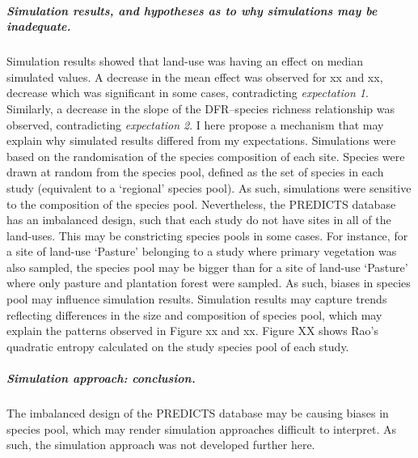 \subparagraph{Simulation results, and hypotheses as to why simulations may be inadequate.}
Simulation results showed that land-use was having an effect on median simulated values. A decrease in the mean effect was observed for xx and xx, decrease which was significant in some cases, contradicting \textit{expectation 1}. Similarly, a decrease in the slope of the DFR--species richness relationship was observed, contradicting \textit{expectation 2}. I here propose a mechanism that may explain why simulated results differed from my expectations. Simulations were based on the randomisation of the species composition of each site. Species were drawn at random from the species pool, defined as the set of species in each study (equivalent to a `regional' species pool). As such, simulations were sensitive to the composition of the species pool. Nevertheless, the PREDICTS database has an imbalanced design, such that each study do not have sites in all of the land-uses. This may be constricting species pools in some cases. For instance, for a site of land-use `Pasture' belonging to a study where primary vegetation was also sampled, the species pool may be bigger than for a site of land-use `Pasture' where only pasture and plantation forest were sampled. As such, biases in species pool may influence simulation results. Simulation results may capture trends reflecting differences in the size and composition of species pool, which may explain the patterns observed in Figure xx and xx. Figure XX shows Rao's quadratic entropy calculated on the study species pool of each study.

\subparagraph{Simulation approach: conclusion.} The imbalanced design of the PREDICTS database may be causing biases in species pool, which may render simulation approaches difficult to interpret. As such, the simulation approach was not developed further here.

